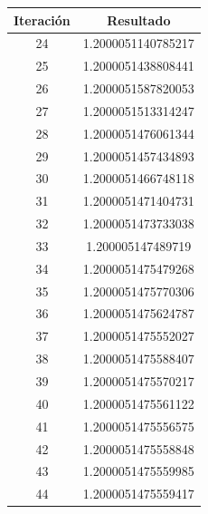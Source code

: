\documentclass[titlepage,a4paper]{article}
\begin{document}
\begin{multicols}{2}
\begin{center}
\begin{tabular}{| c | c |}
           \hline
    \end{tabular}
\end{center}
        \begin{center}
    \begin{tabular}{| c | c |}
    \hline
     Iteración & Resultado \\ \hline
      24     &  1.2000051140785217 \\
25     &  1.2000051438808441 \\
26     &  1.2000051587820053 \\
27     &  1.2000051513314247 \\
28     &  1.2000051476061344 \\
29     &  1.2000051457434893 \\
30     &  1.2000051466748118 \\
31     &  1.2000051471404731 \\
32     &  1.2000051473733038 \\
33     &  1.200005147489719 \\
34     &  1.2000051475479268 \\
35     &  1.2000051475770306 \\
36     &  1.2000051475624787 \\
37     &  1.2000051475552027 \\
38     &  1.2000051475588407 \\
39     &  1.2000051475570217 \\
40     &  1.2000051475561122 \\
41     &  1.2000051475556575 \\
42     &  1.2000051475558848 \\
43     &  1.2000051475559985 \\
44     &  1.2000051475559417 \\
    \hline
    \end{tabular}
\end{center}
\end{multicols}
\end{document}
